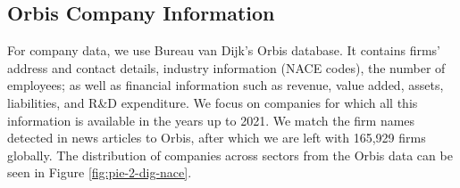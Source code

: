 
\subsection{\protect Orbis Company Information}
\label{sec:orbis}
For company data, we use Bureau van Dijk's Orbis database. It contains firms' address and contact details, industry information (NACE codes), the number of employees; as well as financial information such as revenue, value added, assets, liabilities, and R\&D expenditure. We focus on companies for which all this information is available in the years up to 2021. We match the firm names detected in news articles to Orbis, after which we are left with 165,929 firms globally. The distribution of companies across sectors from the Orbis data can be seen in Figure \ref{fig:pie-2-dig-nace}.

